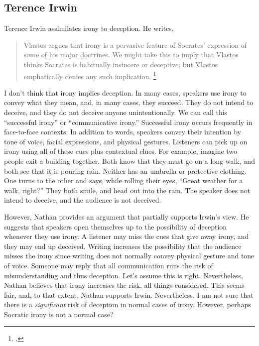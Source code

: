 \documentclass[12pt,letterpaper]{article}
\begin{document}
\subsection*{Terence Irwin}

Terence Irwin assimilates irony to deception. He writes,

\begin{quote}

    Vlastos argues that irony is a pervasive feature of Socrates' expression of some of his major doctrines.
We might take this to imply that Vlastos thinks Socrates is habitually insincere or deceptive; but Vlastos emphatically denies any such implication.
\footcite[][242]{irwin-socratic-puzzles-1992}
\end{quote}

I don't think that irony implies deception.
In many cases, speakers use irony to convey what they mean, and, in many cases, they succeed.
They do not intend to deceive, and they do not deceive anyone unintentionally.
We can call this ``successful irony'' or ``communicative irony.''
Successful irony occurs frequently in face-to-face contexts.
In addition to words, speakers convey their intention by tone of voice, facial expressions, and physical gestures.
Listeners can pick up on irony using all of these cues plus contextual clues.
For example, imagine two people exit a building together.
Both know that they must go on a long walk, and both see that it is pouring rain.
Neither has an umbrella or protective clothing.
One turns to the other and says, while rolling their eyes, ``Great weather for a walk, right?''
They both smile, and head out into the rain.
The speaker does not intend to deceive, and the audience is not deceived.

However, Nathan provides an argument that partially supports Irwin's view.
He suggests that speakers open themselves up to the possibility of deception whenever they use irony.
A listener may miss the cues that give away irony, and they may end up deceived.
Writing increases the possibility that the audience misses the irony since writing does not normally convey physical gesture and tone of voice.
Someone may reply that all communication runs the risk of misunderstanding and thus deception.
Let's assume this is right.
Nevertheless, Nathan believes that irony increases the risk, all things considered.
This seems fair, and, to that extent, Nathan supports Irwin.
Nevertheless, I am not sure that there is a \textit{significant} risk of deception in normal cases of irony.
However, perhaps Socratic irony is not a normal case?
\end{document}
